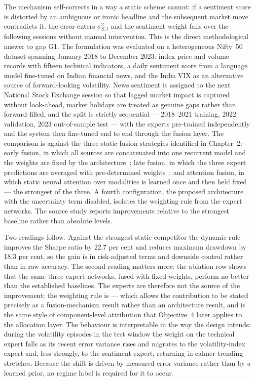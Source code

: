 The mechanism self-corrects in a way a static scheme cannot: if a sentiment score is distorted
by an ambiguous or ironic headline and the subsequent market move contradicts it, the error
enters $\sigma_{S,t}^2$ and the sentiment weight falls over the following sessions without
manual intervention. This is the direct methodological answer to gap G1. The formulation was
evaluated on a heterogeneous Nifty~50 dataset spanning January 2018 to December 2023: index
price and volume records with fifteen technical indicators, a daily sentiment score from a
language model fine-tuned on Indian financial news, and the India VIX as an alternative source
of forward-looking volatility. News sentiment is assigned to the next National Stock Exchange
session so that lagged market impact is captured without look-ahead, market holidays are treated
as genuine gaps rather than forward-filled, and the split is strictly sequential ---
2018--2021 training, 2022 validation, 2023 out-of-sample test --- with the experts pre-trained
independently and the system then fine-tuned end to end through the fusion layer.
The comparison is against the three static fusion strategies identified in Chapter~2: early
fusion, in which all sources are concatenated into one recurrent model and the weights are
fixed by the architecture~\cite{moodi2024}; late fusion, in which the three expert predictions
are averaged with pre-determined weights~\cite{farimani2024}; and attention fusion, in which
static neural attention over modalities is learned once and then held
fixed~\cite{liu2019attention,haryono2023} --- the strongest of the three. A fourth
configuration, the proposed architecture with the uncertainty term disabled, isolates the
weighting rule from the expert networks. The source study reports improvements relative to the
strongest baseline rather than absolute levels.

Two readings follow. Against the strongest static competitor the dynamic rule improves the
Sharpe ratio by 22.7 per cent and reduces maximum drawdown by 18.3 per cent, so the gain is in
risk-adjusted terms and downside control rather than in raw accuracy. The second reading matters
more: the ablation row shows that the same three expert networks, fused with fixed weights,
perform no better than the established baselines. The experts are therefore not the source of
the improvement; the weighting rule is --- which allows the contribution to be stated precisely
as a fusion-mechanism result rather than an architecture result, and is the same style of
component-level attribution that Objective~4 later applies to the allocation layer. The
behaviour is interpretable in the way the design intends: during the volatility episodes in the
test window the weight on the technical expert falls as its recent error variance rises and
migrates to the volatility-index expert and, less strongly, to the sentiment expert, returning
in calmer trending stretches. Because the shift is driven by measured error variance rather than
by a learned prior, no regime label is required for it to occur.

